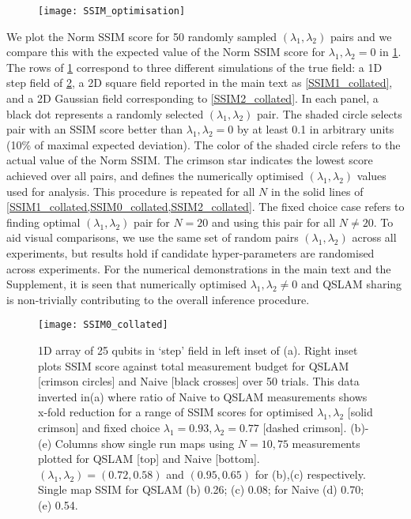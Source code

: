 \begin{figure}
	\texttt{[image: SSIM\_optimisation]}
	\caption{\label{SSIM_optimisation} }  	
\end{figure}  
We plot the Norm SSIM score for 50 randomly sampled $(\lambda_1, \lambda_2)$ pairs and we compare this with the expected value of the Norm SSIM score for $\lambda_1, \lambda_2 = 0$ in \cref{SSIM_optimisation}. The rows of \cref{SSIM_optimisation} correspond to three different simulations of the true field: a 1D step field of \cref{SSIM0_collated}, a 2D square field reported in the main text as \cref{SSIM1_collated}, and a 2D Gaussian field corresponding to \cref{SSIM2_collated}. In each panel, a black dot represents a randomly selected $(\lambda_1, \lambda_2)$ pair. The shaded circle selects pair with an SSIM score better than $\lambda_1, \lambda_2 = 0$ by at least 0.1 in arbitrary units (10\% of maximal expected deviation). The color of the shaded circle refers to the actual value of the Norm SSIM. The crimson star indicates the lowest score achieved over all pairs, and defines the numerically optimised $(\lambda_1, \lambda_2)$ values used for analysis. This procedure is repeated for all $N$ in the solid lines of \cref{SSIM1_collated,SSIM0_collated,SSIM2_collated}. The fixed choice case refers to finding optimal $(\lambda_1, \lambda_2)$  pair for $N=20$  and using this pair for all $N \neq 20$. To aid visual comparisons, we use the same set of random pairs $(\lambda_1, \lambda_2)$ across all experiments, but results hold if candidate hyper-parameters are randomised across experiments. For the numerical demonstrations in the main text and the Supplement, it is seen that numerically optimised $\lambda_1, \lambda_2 \neq 0$ and QSLAM sharing is non-trivially contributing to the overall inference procedure. 

\begin{figure}
	\texttt{[image: SSIM0\_collated]}
	\caption{\label{SSIM0_collated} 1D array of 25 qubits in `step' field in left inset of (a).  Right inset plots SSIM score against total measurement budget for QSLAM [crimson circles] and Naive [black crosses] over 50 trials. This data inverted in(a) where ratio of Naive to QSLAM measurements shows x-fold reduction for a range of SSIM scores for optimised $\lambda_1, \lambda_2$ [solid crimson] and fixed choice $\lambda_1 = 0.93, \lambda_2 = 0.77$ [dashed crimson]. (b)-(e) Columns show single run maps using $N=10, 75$ measurements plotted for QSLAM [top] and Naive [bottom]. $(\lambda_1, \lambda_2)= (0.72, 0.58)$ and $ (0.95, 0.65)$ for (b),(c) respectively. Single map SSIM for QSLAM (b) 0.26; (c) 0.08; for Naive (d) 0.70;  (e) 0.54.}    	
\end{figure} 


